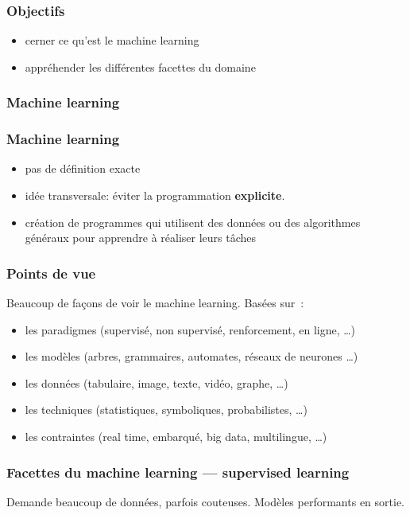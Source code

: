 \begin{frame}
  \frametitle{Objectifs}
  \begin{itemize}
  \item cerner ce qu'est le machine learning
  \item appréhender les différentes facettes du domaine
  \end{itemize}
\end{frame}

\begin{frame}
  \frametitle{Machine learning}
\end{frame}

\begin{frame}
  \frametitle{Machine learning}
  \begin{itemize}
  \item pas de définition exacte
  \item idée transversale: éviter la programmation \textbf{explicite}.
  \item création de programmes qui utilisent des données ou des
    algorithmes généraux pour apprendre à réaliser leurs tâches
  \end{itemize}
\end{frame}

\begin{frame}
  \frametitle{Points de vue}
  Beaucoup de façons de voir le machine learning. Basées sur :
  \begin{itemize}[<+->]
  \item les paradigmes (supervisé, non supervisé, renforcement, en
    ligne, …)
  \item les modèles (arbres, grammaires, automates, réseaux de
    neurones …)
  \item les données (tabulaire, image, texte, vidéo, graphe, …)
  \item les techniques (statistiques, symboliques, probabilistes, …)
  \item les contraintes (real time, embarqué, big data, multilingue,
    …)
  \end{itemize}

\end{frame}

\begin{frame}
  \frametitle{Facettes du machine learning — supervised learning}
  Demande beaucoup de données, parfois couteuses. Modèles performants
  en sortie.
\end{frame}

